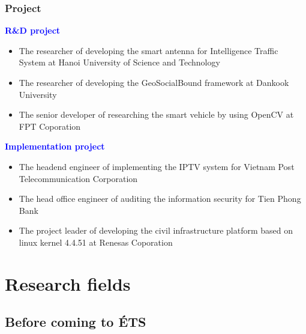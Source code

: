 \documentclass{beamer}
\begin{document}

\begin{frame}
\frametitle{Project}
\textcolor{blue}{\textbf{R\&D project}}
\begin{itemize}



	\item The researcher of developing the smart antenna for Intelligence Traffic System at Hanoi University of Science and Technology
	\item The researcher of developing the GeoSocialBound framework at Dankook University
	
	\item The senior developer of researching the smart vehicle by using OpenCV at FPT Coporation
\end{itemize}
\textcolor{blue}{\textbf{Implementation project}}
\begin{itemize}

		\item The headend engineer of implementing the IPTV system for Vietnam Post Telecommunication Corporation
	
	\item The head office engineer of auditing the information security for Tien Phong Bank
	\item The project leader of developing the civil infrastructure platform based on linux kernel 4.4.51 at Renesas Coporation
\end{itemize}	

\end{frame}








\section{Research fields}



\subsection{Before coming to \'ETS}
\end{document}
